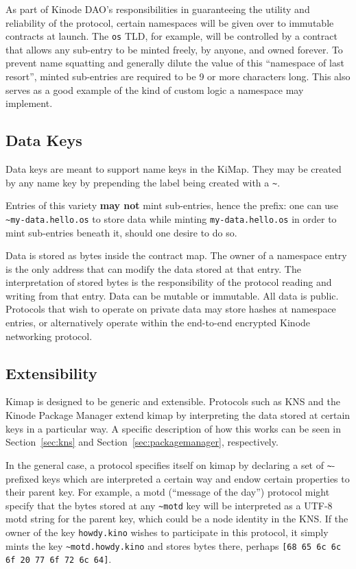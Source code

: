 \documentclass[runningheads]{llncs}
\begin{document}
As part of Kinode DAO's responsibilities in guaranteeing the utility and reliability of the protocol, certain namespaces will be given over to immutable contracts at launch.
The \verb|os| TLD, for example, will be controlled by a contract that allows any sub-entry to be minted freely, by anyone, and owned forever.
To prevent name squatting and generally dilute the value of this ``namespace of last resort'', minted sub-entries are required to be 9 or more characters long.
This also serves as a good example of the kind of custom logic a namespace may implement.

\subsection{Data Keys}
\label{sec:terminalnodes}

Data keys are meant to support name keys in the KiMap. They may be created by any name key by prepending the label being created with a \verb|~|.

Entries of this variety \textbf{may not} mint sub-entries, hence the prefix: one can use \verb|~my-data.hello.os| to store data while minting \verb|my-data.hello.os| in order to mint sub-entries beneath it, should one desire to do so.

Data is stored as bytes inside the contract map.
The owner of a namespace entry is the only address that can modify the data stored at that entry.
The interpretation of stored bytes is the responsibility of the protocol reading and writing from that entry.
Data can be mutable or immutable.
All data is public.
Protocols that wish to operate on private data may store hashes at namespace entries, or alternatively operate within the end-to-end encrypted Kinode networking protocol.

\subsection{Extensibility}
\label{sec:extensibility}

Kimap is designed to be generic and extensible.
Protocols such as KNS and the Kinode Package Manager extend kimap by interpreting the data stored at certain keys in a particular way.
A specific description of how this works can be seen in Section~\ref{sec:kns} and Section~\ref{sec:packagemanager}, respectively.

In the general case, a protocol specifies itself on kimap by declaring a set of \verb|~|-prefixed keys which are interpreted a certain way and endow certain properties to their parent key.
For example, a motd (``message of the day'') protocol might specify that the bytes stored at any \verb|~motd| key will be interpreted as a UTF-8 motd string for the parent key, which could be a node identity in the KNS.
If the owner of the key \verb|howdy.kino| wishes to participate in this protocol, it simply mints the key \verb|~motd.howdy.kino| and stores bytes there, perhaps \verb|[68 65 6c 6c 6f 20 77 6f 72 6c 64]|.
\end{document}
